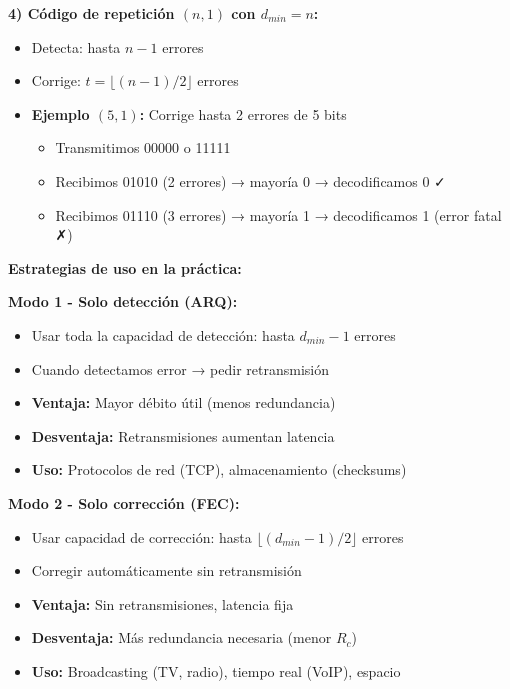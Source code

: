 \documentclass[10pt,a4paper]{article}
\begin{document}
\textbf{4) Código de repetición $(n,1)$ con $d_{min} = n$:}
\begin{itemize}
\item Detecta: hasta $n-1$ errores
\item Corrige: $t = \lfloor (n-1)/2 \rfloor$ errores
\item \textbf{Ejemplo $(5,1)$:} Corrige hasta 2 errores de 5 bits
  \begin{itemize}
  \item Transmitimos 00000 o 11111
  \item Recibimos 01010 (2 errores) → mayoría 0 → decodificamos 0 ✓
  \item Recibimos 01110 (3 errores) → mayoría 1 → decodificamos 1 (error fatal ✗)
  \end{itemize}
\end{itemize}

\textbf{Estrategias de uso en la práctica:}

\textbf{Modo 1 - Solo detección (ARQ):}
\begin{itemize}
\item Usar toda la capacidad de detección: hasta $d_{min}-1$ errores
\item Cuando detectamos error → pedir retransmisión
\item \textbf{Ventaja:} Mayor débito útil (menos redundancia)
\item \textbf{Desventaja:} Retransmisiones aumentan latencia
\item \textbf{Uso:} Protocolos de red (TCP), almacenamiento (checksums)
\end{itemize}

\textbf{Modo 2 - Solo corrección (FEC):}
\begin{itemize}
\item Usar capacidad de corrección: hasta $\lfloor(d_{min}-1)/2\rfloor$ errores
\item Corregir automáticamente sin retransmisión
\item \textbf{Ventaja:} Sin retransmisiones, latencia fija
\item \textbf{Desventaja:} Más redundancia necesaria (menor $R_c$)
\item \textbf{Uso:} Broadcasting (TV, radio), tiempo real (VoIP), espacio
\end{itemize}
\end{document}
